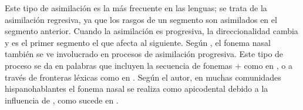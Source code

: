 Este tipo de asimilación es la más frecuente en las lenguas; se trata de la
asimilación regresiva, ya que los rasgos de un segmento son asimilados en el
segmento anterior. Cuando la asimilación es progresiva, la direccionalidad
cambia y es el primer segmento el que afecta al siguiente. Según
\textcite{ullman2006}, el fonema nasal también se ve involucrado en procesos de
asimilación progresiva. Este tipo de proceso se da en palabras que incluyen la
secuencia de fonemas  +  como en , o a través
de fronteras léxicas como en . Según el autor, en muchas
comunidades hispanohablantes el fonema nasal se realiza como apicodental
 debido a la influencia de , como sucede en
.

